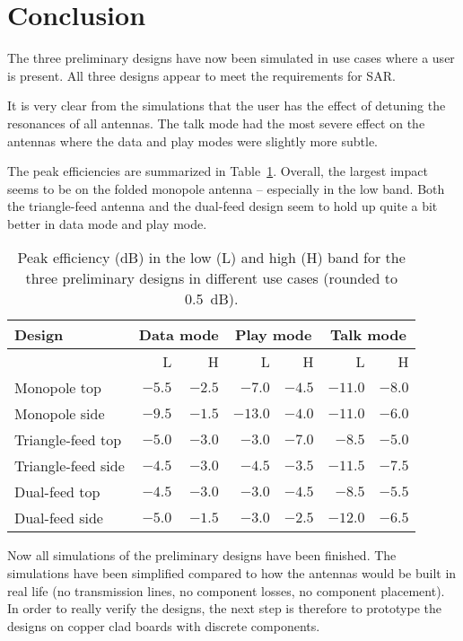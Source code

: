 \section{Conclusion}
The three preliminary designs have now been simulated in use cases where a user is present. All three designs appear to meet the requirements for SAR.

It is very clear from the simulations that the user has the effect of detuning the resonances of all antennas. The talk mode had the most severe effect on the antennas where the data and play modes were slightly more subtle.

The peak efficiencies are summarized in Table~\ref{tab:peakefficiencycomp}. Overall, the largest impact seems to be on the folded monopole antenna -- especially in the low band. Both the triangle-feed antenna and the dual-feed design seem to hold up quite a bit better in data mode and play mode.

\begin{table}[htbp]
    \centering
    \begin{tabular}{|l|r|r|r|r|r|r|}
        \hline
        Design             & \multicolumn{2}{c|}{Data mode}   & \multicolumn{2}{c|}{Play mode}   & \multicolumn{2}{c|}{Talk mode} \\
        \hline
         & L & H & L & H & L & H \\
        \hline
        Monopole top       & $-5.5$ & $-2.5$ & $-7.0 $  & $-4.5$ & $-11.0  $ & $-8.0$ \\
        Monopole side      & $-9.5$ & $-1.5$ & $-13.0 $ & $-4.0$ & $-11.0  $ & $-6.0$ \\
        \hline
        Triangle-feed top  & $-5.0$ & $-3.0$ & $-3.0  $ & $-7.0$ & $-8.5 $   & $-5.0$ \\
        Triangle-feed side & $-4.5$ & $-3.0$ & $-4.5$   & $-3.5$ & $-11.5$   & $-7.5$ \\
        \hline
        Dual-feed top   & $-4.5$ & $-3.0$ & $-3.0  $ & $-4.5$ & $-8.5 $   & $-5.5$ \\
        Dual-feed side  & $-5.0$ & $-1.5$ & $-3.0 $  & $-2.5$ & $-12.0  $ & $-6.5$ \\
        \hline
    \end{tabular}
    \caption{Peak efficiency (dB) in the low (L) and high (H) band for the three preliminary designs in different use cases (rounded to \SI{0.5}{dB}).}
    \label{tab:peakefficiencycomp}
\end{table}

Now all simulations of the preliminary designs have been finished. The simulations have been simplified compared to how the antennas would be built in real life (no transmission lines, no component losses, no component placement). In order to really verify the designs, the next step is therefore to prototype the designs on copper clad boards with discrete components.
